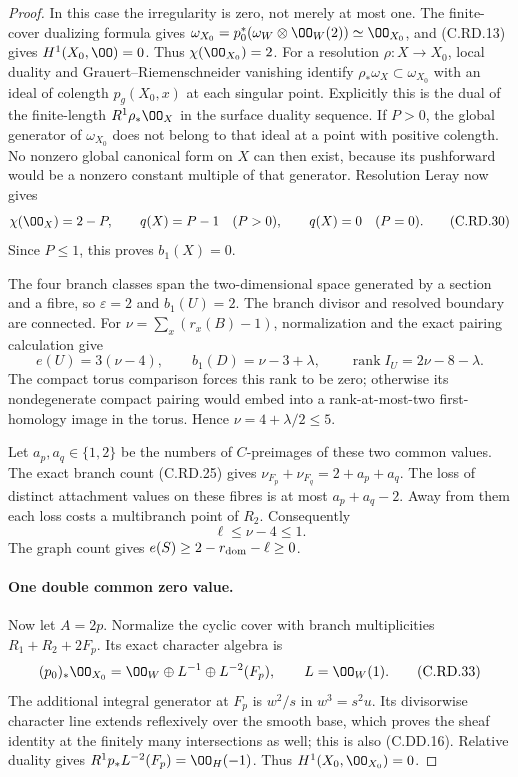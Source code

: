 \begin{proof}
In this case the irregularity is zero, not
merely at most one. The finite-cover dualizing
formula gives
$\omega_{X_0}=p_0^*(\omega_W\otimes\OO_W(2))
\simeq\OO_{X_0}$, and (C.RD.13) gives
$H^1(X_0,\OO)=0$. Thus $\chi(\OO_{X_0})=2$.
For a resolution $\rho:X\to X_0$, local duality
and Grauert--Riemenschneider vanishing identify
$\rho_*\omega_X\subset\omega_{X_0}$ with an
ideal of colength $p_g(X_0,x)$ at each singular
point. Explicitly this is the dual of the
finite-length $R^1\rho_*\OO_X$ in the surface
duality sequence. If $P>0$, the global generator
of $\omega_{X_0}$ does not belong to that ideal
at a point with positive colength. No nonzero
global canonical form on $X$ can then exist,
because its pushforward would be a nonzero
constant multiple of that generator.
Resolution Leray now gives
\[
 \chi(\OO_X)=2-P,
 \qquad q(X)=P-1\quad(P>0),
 \qquad q(X)=0\quad(P=0).
\tag{C.RD.30}
\]
Since $P\le1$, this proves $b_1(X)=0$.

The four branch classes span the two-dimensional
space generated by a section and a fibre, so
$\varepsilon=2$ and $b_1(U)=2$.
The branch divisor and resolved boundary are
connected. For
$\nu=\sum_x(r_x(B)-1)$, normalization and the
exact pairing calculation give
\[
 e(U)=3(\nu-4),\qquad b_1(D)=\nu-3+\lambda,
 \qquad \operatorname{rank}I_U=2\nu-8-\lambda.
\tag{C.RD.31}
\]
The compact torus comparison forces this rank
to be zero; otherwise its nondegenerate compact
pairing would embed into a rank-at-most-two
first-homology image in the torus. Hence
$\nu=4+\lambda/2\le5$.

Let $a_p,a_q\in\{1,2\}$ be the numbers of
$C$-preimages of these two common values.
The exact branch count (C.RD.25) gives
$\nu_{F_p}+\nu_{F_q}=2+a_p+a_q$.
The loss of distinct attachment values on
these fibres is at most $a_p+a_q-2$.
Away from them each loss costs a multibranch
point of $R_2$. Consequently
\[
                    \ell\le\nu-4\le1.
\tag{C.RD.32}
\]
The graph count gives
$e(S)\ge2-r_{\rm dom}-\ell\ge0$.

\paragraph{One double common zero value.}
Now let $A=2p$. Normalize the cyclic cover
with branch multiplicities $R_1+R_2+2F_p$.
Its exact character algebra is
\[
 (p_0)_*\OO_{X_0}
       =\OO_W\oplus L^{-1}\oplus L^{-2}(F_p),
                  \qquad L=\OO_W(1).
\tag{C.RD.33}
\]
The additional integral generator at $F_p$
is $w^2/s$ in $w^3=s^2u$. Its divisorwise
character line extends reflexively over the
smooth base, which proves the sheaf identity
at the finitely many intersections as well;
this is also (C.DD.16). Relative duality gives
$R^1p_*L^{-2}(F_p)=\OO_H(-1)$.
Thus $H^1(X_0,\OO_{X_0})=0$.


\end{proof}
